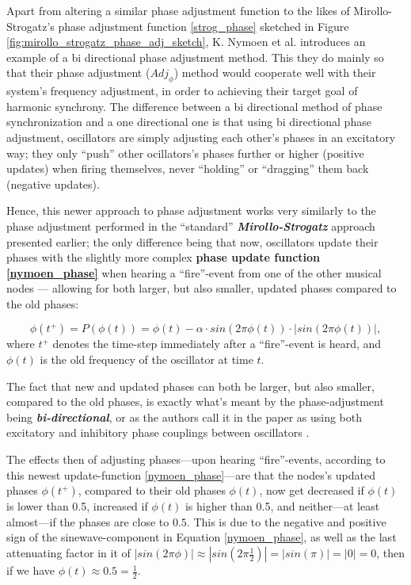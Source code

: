 	Apart from altering a similar phase adjustment function to the likes of Mirollo-Strogatz's phase adjustment function \eqref{strog_phase} sketched in Figure \ref{fig:mirollo_strogatz_phase_adj_sketch}, K. Nymoen et al. \cite{nymoen_synch} introduces an example of a bi directional phase adjustment method. This they do mainly so that their phase adjustment ($Adj_{\phi}$) method would cooperate well with their system's frequency adjustment, in order to achieving their target goal of harmonic synchrony. The difference between a bi directional method of phase synchronization and a one directional one is that using bi directional phase adjustment, oscillators are simply adjusting each other's phases in an excitatory way; they only ``push'' other ocillators's phases further or higher (positive updates) when firing themselves, never ``holding'' or ``dragging'' them back (negative updates).

	Hence, this newer approach to phase adjustment works very similarly to the phase adjustment performed in the ``standard'' \textbf{\textit{Mirollo-Strogatz}} approach presented earlier; the only difference being that now, oscillators update their phases with the slightly more complex \textbf{phase update function \eqref{nymoen_phase}} when hearing a ``fire''-event from one of the other musical nodes — allowing for both larger, but also smaller, updated phases compared to the old phases:

	\begin{equation}
	\label{nymoen_phase}
		\phi(t^+)=P(\phi(t)) = \phi(t) - \alpha \cdot sin(2\pi\phi(t)) \cdot | sin(2\pi\phi(t)) | ,
	\end{equation} \nl
	where $t^+$ denotes the time-step immediately after a ``fire''-event is heard, and $\phi(t)$ is the old frequency of the oscillator at time $t$.

	The fact that new and updated phases can both be larger, but also smaller, compared to the old phases, is exactly what's meant by the phase-adjustment being \textbf{\textit{bi-directional}}, or as the authors call it in the paper as using both excitatory and inhibitory phase couplings between oscillators \cite{nymoen_synch}.

	The effects then of adjusting phases—upon hearing ``fire''-events, according to this newest update-function \eqref{nymoen_phase}—are that the nodes's updated phases $\phi(t^+)$, compared to their old phases $\phi(t)$, now get decreased if $\phi(t)$ is lower than 0.5, increased if $\phi(t)$ is higher than 0.5, and neither—at least almost—if the phases are close to $0.5$. This is due to the negative and positive sign of the sinewave-component in Equation \eqref{nymoen_phase}, as well as the last attenuating factor in it of $| sin(2\pi\phi) | \approx | sin(2\pi \frac{1}{2}) | = | sin(\pi) | = | 0 | = 0$, then if we have $\phi(t) \approx 0.5 = \frac{1}{2}$.

